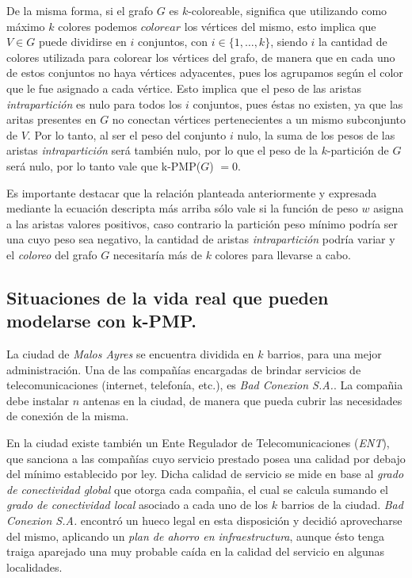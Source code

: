 De la misma forma, si el grafo $G$ es $k$-coloreable, significa que utilizando
como máximo $k$ colores podemos $colorear$ los vértices del mismo, esto implica
que $V \in G$ puede dividirse en $i$ conjuntos, con $i \in \{1, \dots, k\}$, siendo $i$ la cantidad de colores utilizada para colorear los vértices del grafo, de manera que en cada uno de estos conjuntos no haya vértices adyacentes, pues los agrupamos según el color que le fue asignado a cada vértice. Esto implica que el peso de las aristas \textit{intrapartición} es nulo para todos los $i$ conjuntos, pues éstas no existen, ya que las aritas presentes en $G$ no conectan vértices pertenecientes a un mismo subconjunto de $V$. Por lo tanto, al ser el peso del conjunto $i$ nulo, la suma de los pesos de las aristas \textit{intrapartición} será también nulo, por lo que el peso de la $k$-partición de $G$ será nulo, por lo tanto vale que k-PMP($G$) $= 0$.

Es importante destacar que la relación planteada anteriormente y expresada mediante la ecuación descripta más arriba sólo vale si la función de peso $w$ asigna a las aristas valores positivos, caso contrario la partición peso mínimo podría ser una cuyo peso sea negativo, la cantidad de aristas \textit{intrapartición} podría variar y el \textit{coloreo} del grafo $G$ necesitaría más de $k$ colores para llevarse a cabo.



\newpage
\subsection{Situaciones de la vida real que pueden modelarse con k-PMP.}
\vspace*{0.3cm}

La ciudad de \textit{Malos Ayres} se encuentra dividida en $k$ barrios, para una mejor administración. Una de las compañías encargadas de brindar servicios de telecomunicaciones (internet, telefonía, etc.), es \textit{Bad Conexion S.A.}.
La compañia debe instalar $n$ antenas en la ciudad, de manera que pueda cubrir las necesidades de conexión de la misma.

En la ciudad existe también un Ente Regulador de Telecomunicaciones (\textit{ENT}), que sanciona a las compañías cuyo servicio prestado posea una calidad por debajo del mínimo establecido por ley. Dicha calidad de servicio se mide en base al \textit{grado de conectividad global} que otorga cada compañia, el cual se calcula sumando el \textit{grado de conectividad local} asociado a cada uno de los $k$ barrios de la ciudad. \textit{Bad Conexion S.A.} encontró un hueco legal en esta disposición y decidió aprovecharse del mismo, aplicando un \textit{plan de ahorro en infraestructura}, aunque ésto tenga traiga aparejado una muy probable caída en la calidad del servicio en algunas localidades.


